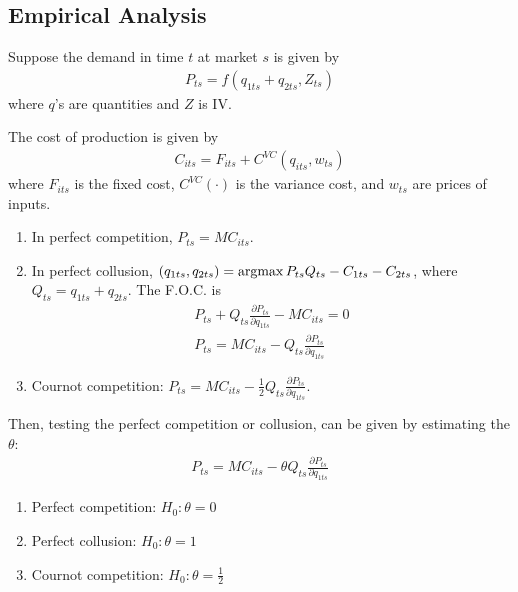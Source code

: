 \documentclass[11pt]{elegantbook_2}
\newcommand{\argmax}{\operatornamewithlimits{argmax}}
\begin{document}
\subsection{Empirical Analysis}
Suppose the demand in time $t$ at market $s$ is given by
\begin{equation}
    \begin{aligned}
        P_{ts}=f\left(q_{1ts}+q_{2ts},Z_{ts}\right)
    \end{aligned}
    \nonumber
\end{equation}
where $q$'s are quantities and $Z$ is IV.

The cost of production is given by
\begin{equation}
    \begin{aligned}
        C_{its}=F_{its}+C^{VC}\left(q_{its},w_{ts}\right)
    \end{aligned}
    \nonumber
\end{equation}
where $F_{its}$ is the fixed cost, $C^{VC}(\cdot)$ is the variance cost, and $w_{ts}$ are prices of inputs.
\begin{enumerate}
    \item In perfect competition, $P_{ts}=MC_{its}$.
    \item In perfect collusion, $(q_{1ts},q_{2ts})=\argmax P_{ts}Q_{ts}-C_{1ts}-C_{2ts}$, where $Q_{ts}=q_{1ts}+q_{2ts}$. The F.O.C. is
    \begin{equation}
        \begin{aligned}
            P_{ts}+Q_{ts}\frac{\partial P_{ts}}{\partial q_{1ts}}-MC_{its}=0\\
            P_{ts}=MC_{its}-Q_{ts}\frac{\partial P_{ts}}{\partial q_{1ts}}
        \end{aligned}
        \nonumber
    \end{equation}
    \item Cournot competition: $P_{ts}=MC_{its}-\frac{1}{2}Q_{ts}\frac{\partial P_{ts}}{\partial q_{1ts}}$.
\end{enumerate}

Then, testing the perfect competition or collusion, can be given by estimating the $\theta$:
\begin{equation}
    \begin{aligned}
        P_{ts}=MC_{its}-\theta Q_{ts}\frac{\partial P_{ts}}{\partial q_{1ts}}
    \end{aligned}
    \nonumber
\end{equation}
\begin{enumerate}
    \item Perfect competition: $H_0: \theta=0$
    \item Perfect collusion: $H_0: \theta=1$
    \item Cournot competition: $H_0: \theta=\frac{1}{2}$
\end{enumerate}
\end{document}
